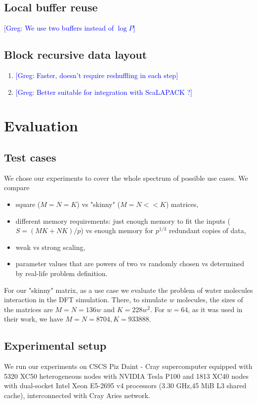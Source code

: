 \documentclass[sigplan,review,anonymous]{acmart}\settopmatter{printfolios=true,printccs=false,printacmref=false}
\newcommand\greg[1]{\textcolor{blue}{[Greg: #1]}}
\begin{document}
\subsection{Local buffer reuse}
\greg{We use two buffers instead of $\log P$}
\subsection{Block recursive data layout}
\begin{enumerate}
	\item \greg{Faster, doesn't require reshuffling in each step}
	\item \greg{Better suitable for integration with ScaLAPACK ?}
\end{enumerate}


\section{Evaluation}
\label{sec:evaluation}

\subsection{Test cases}
We chose our experiments to cover the whole spectrum of possible use cases. We 
compare
\begin{itemize}
	\item square ($M=N=K$) vs "skinny" ($M=N << K$) matrices,
	\item different memory requirements: just enough memory to fit the inputs 
	($S = (MK + NK)/p$) vs enough memory for $p^{1/3}$ redundant copies of data,
	\item weak vs strong scaling,
	\item parameter values that are powers of two vs randomly chosen vs 
	determined by real-life problem definition.
\end{itemize}

For our "skinny" matrix, as a use case we evaluate the problem of water 
molecules interaction in the DFT
simulation\cite{joost}. There, to simulate $w$ molecules, the sizes of the 
matrices are $M=N=136w$ and $K = 228w^2$. For $w=64$, as it was used in their 
work, we have $M=N=8704, K = 933888$.

\subsection{Experimental setup}
We run our experiments on CSCS Piz Daint - Cray supercomputer equipped with 
5320 XC50 heterogeneous nodes with NVIDIA Tesla P100 and 1813 XC40 nodes with 
dual-socket Intel Xeon E5-2695 v4 processors (3.30 GHz,45 MiB L3 shared cache), 
interconnected with Cray Aries network.
\end{document}
